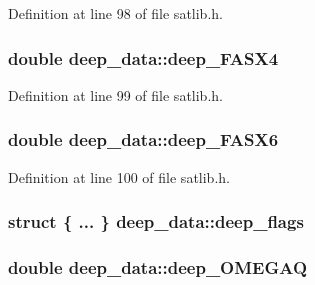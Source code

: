 Definition at line 98 of file satlib.\-h.

\hypertarget{structdeep__data_a8da5269a610ed64efdb20ec003cedfff}{
\subsubsection[{deep\-\_\-\-F\-A\-S\-X4}]{\setlength{\rightskip}{0pt plus 5cm}double deep\-\_\-data\-::deep\-\_\-\-F\-A\-S\-X4}}\label{structdeep__data_a8da5269a610ed64efdb20ec003cedfff}


Definition at line 99 of file satlib.\-h.

\hypertarget{structdeep__data_a7a83916118009f55fd5a3110f27cfc92}{
\subsubsection[{deep\-\_\-\-F\-A\-S\-X6}]{\setlength{\rightskip}{0pt plus 5cm}double deep\-\_\-data\-::deep\-\_\-\-F\-A\-S\-X6}}\label{structdeep__data_a7a83916118009f55fd5a3110f27cfc92}


Definition at line 100 of file satlib.\-h.

\hypertarget{structdeep__data_a000d674d79348a7f2df37166bc0c6852}{
\subsubsection[{deep\-\_\-flags}]{\setlength{\rightskip}{0pt plus 5cm}struct \{ ... \}   deep\-\_\-data\-::deep\-\_\-flags}}\label{structdeep__data_a000d674d79348a7f2df37166bc0c6852}
\hypertarget{structdeep__data_a781f41e5be1a7461d09595a9f40ea031}{
\subsubsection[{deep\-\_\-\-O\-M\-E\-G\-A\-Q}]{\setlength{\rightskip}{0pt plus 5cm}double deep\-\_\-data\-::deep\-\_\-\-O\-M\-E\-G\-A\-Q}}\label{structdeep__data_a781f41e5be1a7461d09595a9f40ea031}


